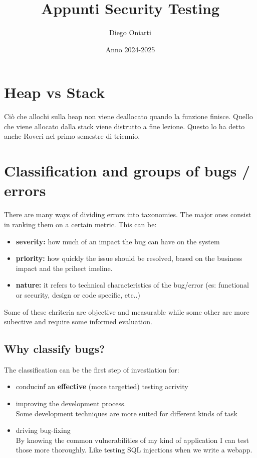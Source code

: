 \documentclass{article}
\title{Appunti Security Testing}
\author{Diego Oniarti}
\date{Anno 2024-2025}
\begin{document}
\maketitle
\tableofcontents

\section{Heap vs Stack}
Ciò che allochi sulla heap non viene deallocato quando la funzione finisce. Quello che viene allocato dalla stack viene distrutto a fine lezione. Questo lo ha detto anche Roveri nel primo semestre di triennio.

\section{Classification and groups of bugs / errors}
There are many ways of dividing errors into taxonomies. The major ones consist in ranking them on a certain metric. This can be:
\begin{itemize}
    \item \textbf{severity:} how much of an impact the bug can have on the system
    \item \textbf{priority:} how quickly the issue should be resolved, based on the business impact and the prihect imeline.
    \item \textbf{nature:} it refers to technical characteristics of the bug/error (es: functional or security, design or code specific, etc..)
\end{itemize}
Some of these chriteria are objective and measurable while some other are more subective and require some informed evaluation.

\subsection{Why classify bugs?}
The classification can be the first step of investiation for:
\begin {itemize}
    \item conducinf an \textbf{effective} (more targetted) testing acrivity
    \item improving the development process. \\ 
        Some development techniques are more suited for different kinds of task
    \item driving bug-fixing \\
        By knowing the common vulnerabilities of my kind of application I can test those more thoroughly. Like testing SQL injections when we write a webapp.
\end {itemize}
\end{document}
